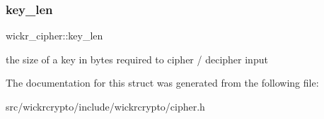 \subsubsection{\texorpdfstring{key\_len}{key\_len}}
{\footnotesize\ttfamily wickr\+\_\+cipher\+::key\+\_\+len}

the size of a key in bytes required to cipher / decipher input 

The documentation for this struct was generated from the following file\+:\begin{DoxyCompactItemize}
\item 
src/wickrcrypto/include/wickrcrypto/cipher.\+h\end{DoxyCompactItemize}
